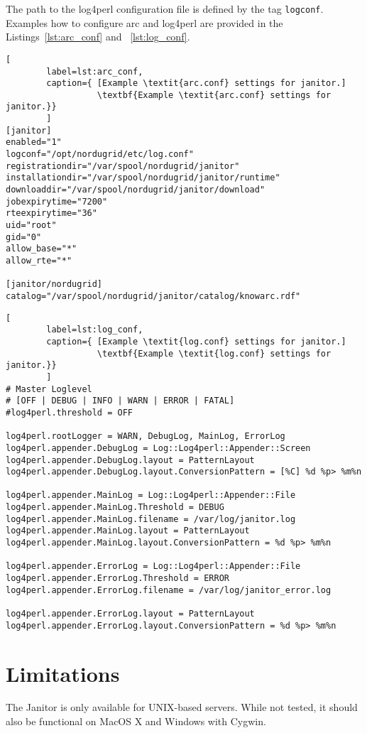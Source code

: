 The path to the log4perl configuration file is defined by the tag
\texttt{logconf}.  Examples how to configure arc and log4perl are
provided in the Listings~\ref{lst:arc_conf} and ~\ref{lst:log_conf}.

\begin{lstlisting}[
        label=lst:arc_conf,
        caption={ [Example \textit{arc.conf} settings for janitor.]
                  \textbf{Example \textit{arc.conf} settings for janitor.}}
        ]
[janitor]
enabled="1"
logconf="/opt/nordugrid/etc/log.conf"
registrationdir="/var/spool/nordugrid/janitor"
installationdir="/var/spool/nordugrid/janitor/runtime"
downloaddir="/var/spool/nordugrid/janitor/download"
jobexpirytime="7200"
rteexpirytime="36"
uid="root"
gid="0"
allow_base="*"
allow_rte="*"

[janitor/nordugrid]
catalog="/var/spool/nordugrid/janitor/catalog/knowarc.rdf"
\end{lstlisting}

\begin{lstlisting}[
        label=lst:log_conf,
        caption={ [Example \textit{log.conf} settings for janitor.]
                  \textbf{Example \textit{log.conf} settings for janitor.}}
        ]
# Master Loglevel
# [OFF | DEBUG | INFO | WARN | ERROR | FATAL]
#log4perl.threshold = OFF

log4perl.rootLogger = WARN, DebugLog, MainLog, ErrorLog
log4perl.appender.DebugLog = Log::Log4perl::Appender::Screen
log4perl.appender.DebugLog.layout = PatternLayout
log4perl.appender.DebugLog.layout.ConversionPattern = [%C] %d %p> %m%n

log4perl.appender.MainLog = Log::Log4perl::Appender::File
log4perl.appender.MainLog.Threshold = DEBUG
log4perl.appender.MainLog.filename = /var/log/janitor.log
log4perl.appender.MainLog.layout = PatternLayout
log4perl.appender.MainLog.layout.ConversionPattern = %d %p> %m%n

log4perl.appender.ErrorLog = Log::Log4perl::Appender::File
log4perl.appender.ErrorLog.Threshold = ERROR
log4perl.appender.ErrorLog.filename = /var/log/janitor_error.log

log4perl.appender.ErrorLog.layout = PatternLayout
log4perl.appender.ErrorLog.layout.ConversionPattern = %d %p> %m%n
\end{lstlisting}



\section{Limitations}

The Janitor is only available for UNIX-based servers. While not tested,
it should also be functional on MacOS X and Windows with Cygwin.

